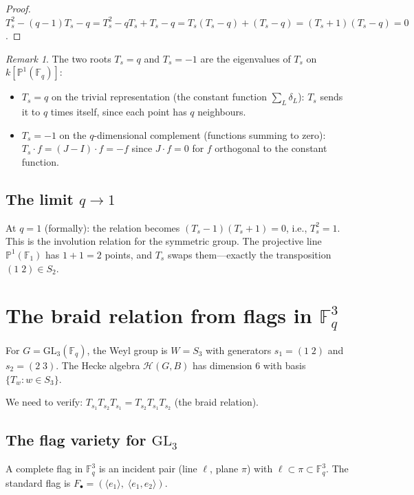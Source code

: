 \documentclass[12pt,a4paper]{article}
\theoremstyle{definition}
\theoremstyle{remark}
\newtheorem{remark}[theorem]{Remark}
\newcommand{\F}{\mathbb{F}}
\newcommand{\GL}{\mathrm{GL}}
\newcommand{\Hecke}{\mathcal{H}}
\newcommand{\PP}{\mathbb{P}}
\begin{document}
\begin{proof}
$T_s^2 - (q-1)T_s - q = T_s^2 - qT_s + T_s - q
= T_s(T_s - q) + (T_s - q) = (T_s + 1)(T_s - q) = 0$.
\end{proof}

\begin{remark}
The two roots $T_s = q$ and $T_s = -1$ are the eigenvalues of
$T_s$ on $k[\PP^1(\F_q)]$:
\begin{itemize}
\item $T_s = q$ on the trivial representation (the constant function
  $\sum_L \delta_L$): $T_s$ sends it to $q$ times itself, since each
  point has $q$ neighbours.
\item $T_s = -1$ on the $q$-dimensional complement (functions summing
  to zero): $T_s \cdot f = (J - I) \cdot f = -f$ since $J \cdot f = 0$
  for $f$ orthogonal to the constant function.
\end{itemize}
\end{remark}

\subsection{The limit $q \to 1$}

At $q = 1$ (formally): the relation becomes $(T_s - 1)(T_s + 1) = 0$,
i.e., $T_s^2 = 1$. This is the involution relation for the symmetric
group. The projective line $\PP^1(\F_1)$ has $1 + 1 = 2$ points, and
$T_s$ swaps them---exactly the transposition $(1\;2) \in S_2$.

\section{The braid relation from flags in $\F_q^3$}
\label{sec:braid}

For $G = \GL_3(\F_q)$, the Weyl group is $W = S_3$ with generators
$s_1 = (1\;2)$ and $s_2 = (2\;3)$. The Hecke algebra
$\Hecke(G, B)$ has dimension $6$ with basis $\{T_w : w \in S_3\}$.

We need to verify: $T_{s_1} T_{s_2} T_{s_1} = T_{s_2} T_{s_1}
T_{s_2}$ (the braid relation).

\subsection{The flag variety for $\GL_3$}

A complete flag in $\F_q^3$ is an incident pair (line $\ell$,
plane $\pi$) with $\ell \subset \pi \subset \F_q^3$. The standard
flag is $F_\bullet = (\langle e_1 \rangle,\;
\langle e_1, e_2 \rangle)$.
\end{document}
